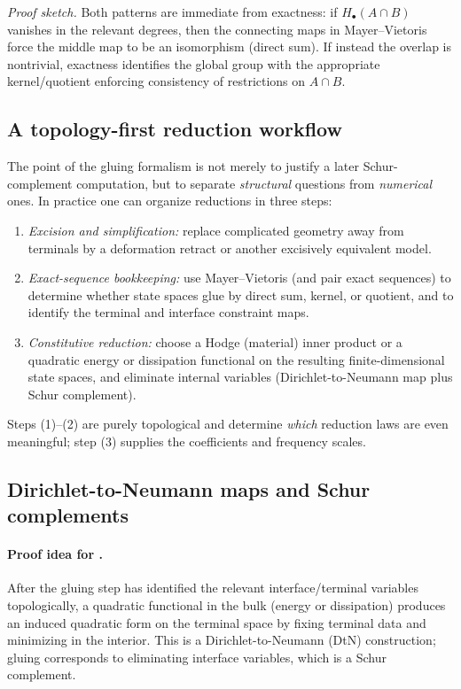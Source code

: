 \documentclass[11pt]{article}
\begin{document}
\noindent\emph{Proof sketch.}
Both patterns are immediate from exactness: if $H_\bullet(A\cap B)$ vanishes in the relevant degrees, then the connecting maps in Mayer--Vietoris force the middle map to be an isomorphism (direct sum).
If instead the overlap is nontrivial, exactness identifies the global group with the appropriate kernel/quotient enforcing consistency of restrictions on $A\cap B$.

\subsection{A topology-first reduction workflow}
\label{sec:topology-first-workflow}
The point of the gluing formalism is not merely to justify a later Schur-complement computation, but to separate \emph{structural} questions from \emph{numerical} ones.
In practice one can organize reductions in three steps:
\begin{enumerate}
  \item \emph{Excision and simplification:} replace complicated geometry away from terminals by a deformation retract or another excisively equivalent model.
  \item \emph{Exact-sequence bookkeeping:} use Mayer--Vietoris (and pair exact sequences) to determine whether state spaces glue by direct sum, kernel, or quotient, and to identify the terminal and interface constraint maps.
  \item \emph{Constitutive reduction:} choose a Hodge (material) inner product or a quadratic energy or dissipation functional on the resulting finite-dimensional state spaces, and eliminate internal variables (Dirichlet-to-Neumann map plus Schur complement).
\end{enumerate}
Steps (1)--(2) are purely topological and determine \emph{which} reduction laws are even meaningful; step (3) supplies the coefficients and frequency scales.

\subsection{Dirichlet-to-Neumann maps and Schur complements}
\label{sec:dtn}
\paragraph{Proof idea for .}
After the gluing step has identified the relevant interface/terminal variables topologically, a quadratic functional in the bulk (energy or dissipation) produces an induced quadratic form on the terminal space by fixing terminal data and minimizing in the interior.
This is a Dirichlet-to-Neumann (DtN) construction; gluing corresponds to eliminating interface variables, which is a Schur complement.
\end{document}
